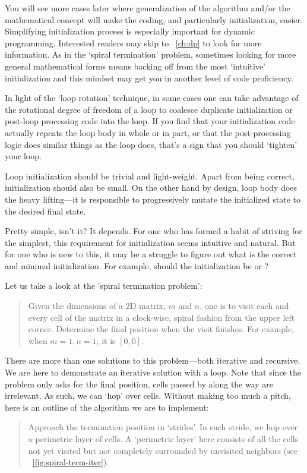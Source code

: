 You will see more cases later where generalization of the algorithm and/or the mathematical
concept will make the coding, and particularly initialization, easier.
Simplifying initialization process is especially important for dynamic programming.
Interested readers may skip to ~\autoref{ch:dp} to look for more information.
As in the `spiral termination' problem, sometimes looking for more general mathematical forms
means backing off from the most `intuitive' initialization and this mindset may get you in another
level of code proficiency.


In light of the `loop rotation' technique, in some cases one can take advantage of the rotational
degree of freedom of a loop to coalesce duplicate initialization
or post-loop processing code into the loop.
If you find that your initialization code actually repeats the loop body in whole or in part,
or that the post-processing logic does similar things as the loop does,
that's a sign that you should `tighten' your loop.


Loop initialization should be trivial and light-weight.
Apart from being correct, initialization should also be small.
On the other hand by design, loop body does the heavy lifting---it is responsible to progressively
mutate the initialized state to the desired final state.


Pretty simple, isn't it?
It depends.
For one who has formed a habit of striving for the simplest,
this requirement for initialization seems intuitive and natural.
But for one who is new to this, it may be a struggle
to figure out what is the correct and minimal initialization.
For example, should the initialization be  or ?


Let us take a look at the 'spiral termination problem':
\begin{quote}
    Given the dimensions of a $2$D matrix, $m$ and $n$,
    one is to visit each and every cell of the matrix in
    a clock-wise, spiral fashion from the upper left corner.
    Determine the final position when the visit finishes.
    For example, when $m=1,n=1$, it is $[0,0]$.
\end{quote}


There are more than one solutions to this problem---both iterative and recursive.
We are here to demonstrate an iterative solution with a loop.
Note that since the problem only asks for the final position,
cells passed by along the way are irrelevant.
As such, we can `hop' over cells.
Without making too much a pitch, here is an outline of the algorithm we are to implement:
\begin{quote}
    Approach the termination position in `strides'.
    In each stride, we hop over a perimetric layer of cells.
    A `perimetric layer' here consists of all the cells not yet visited but not completely
    surrounded by unvisited neighbors (see ~\autoref{fig:spiral-term-iter}).
\end{quote}


